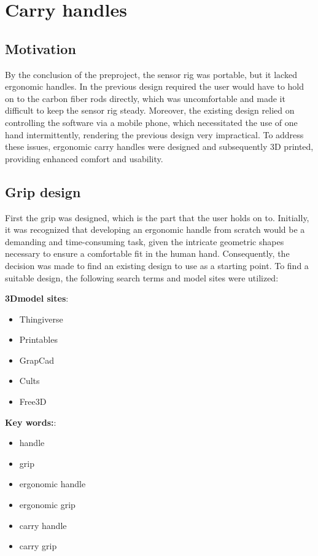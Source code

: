 \section{Carry handles}

\subsection{Motivation}
By the conclusion of the preproject, the sensor rig was portable, but it lacked ergonomic handles.
In the previous design required the user would have to hold on to the carbon fiber rods directly, which was uncomfortable and made it difficult to keep the sensor rig steady.
Moreover, the existing design relied on controlling the software via a mobile phone, which necessitated the use of one hand intermittently, rendering the previous design very impractical.
To address these issues, ergonomic carry handles were designed and subsequently 3D printed, providing enhanced comfort and usability.


\subsection{Grip design}
First the grip was designed, which is the part that the user holds on to.
Initially, it was recognized that developing an ergonomic handle from scratch would be a demanding and time-consuming task, given the intricate geometric shapes necessary to ensure a comfortable fit in the human hand.
Consequently, the decision was made to find an existing design to use as a starting point.
To find a suitable design, the following search terms and model sites were utilized:

\begin{multicols}{2}
    \textbf{3Dmodel sites}:
    \begin{itemize}
        \item Thingiverse
        \item Printables
        \item GrapCad
        \item Cults
        \item Free3D
    \end{itemize}
    \columnbreak
    \textbf{Key words:}:
    \begin{itemize}
        \item handle
        \item grip
        \item ergonomic handle
        \item ergonomic grip
        \item carry handle
        \item carry grip
    \end{itemize}
\end{multicols}


